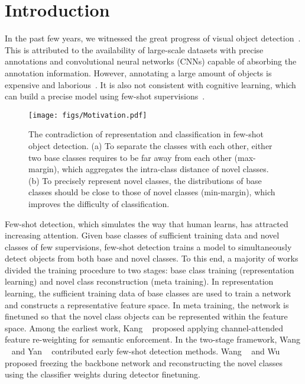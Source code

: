 \documentclass[final]{cvpr}
\begin{document}
\section{Introduction}

In the past few years, we witnessed the great progress of visual object detection~\cite{YOLO,YOLOV2,FRCNN,FasterRCNN}. This is attributed to the availability of large-scale datasets with precise annotations and convolutional neural networks (CNNs) capable of absorbing the annotation information. However, annotating a large amount of objects is expensive and laborious~\cite{CMIL2019,MinEntropy2019,FreeAnchor2019,zhu2017soft}. It is also not consistent with cognitive learning, which can build a precise model using few-shot supervisions~\cite{CompositionalRepre-ICCV2019}.  

\begin{figure}[t]
\centering
\texttt{[image: figs/Motivation.pdf]}
\caption{The contradiction of representation and classification in few-shot object detection. (a) To separate the classes with each other, either two base classes requires to be far away from each other (max-margin), which aggregates the intra-class distance of novel classes. (b) To precisely represent novel classes, the distributions of base classes should be close to those of novel classes (min-margin), which improves the difficulty of classification.}
\label{fig:motivation}
\end{figure}

Few-shot detection, which simulates the way that human learns, has attracted increasing attention. Given base classes of sufficient training data and novel classes of few supervisions, few-shot detection trains a model to simultaneously detect objects from both base and novel classes. To this end, a majority of works divided the training procedure to two stages: base class training (representation learning) and novel class reconstruction (meta training). In representation learning, the sufficient training data of base classes are used to train a network and constructs a representative feature space. In meta training, the network is finetuned so that the novel class objects can be represented within the feature space. Among the earliest work, Kang \etal~\cite{FeatureReweighting} proposed applying channel-attended feature re-weighting for semantic enforcement. In the two-stage framework, Wang \etal~\cite{MetaDet} and Yan \etal~\cite{MetaRCNN} contributed early few-shot detection methods. Wang \etal~\cite{Frustratingly} and Wu \etal~\cite{MPSR} proposed freezing the backbone network and reconstructing the novel classes using the classifier weights during detector finetuning. 
\end{document}
